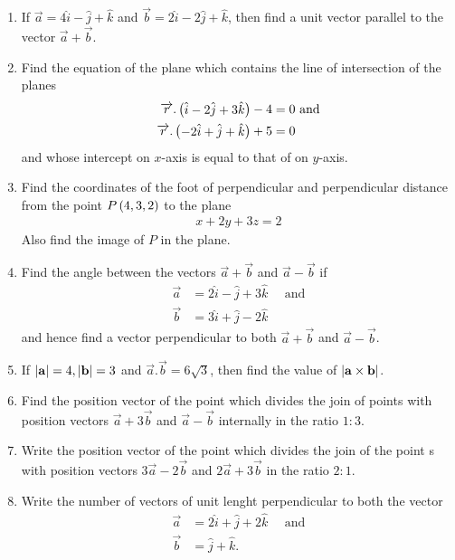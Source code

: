 \begin{enumerate}
	\item If $\overrightarrow{a} = 4\hat{i} - \hat{j} +\hat{k}$ and $\overrightarrow{b} = 2\hat{i} - 2\hat{j} + \hat{k}$, then find a unit vector parallel to the vector $\overrightarrow{a}+\overrightarrow{b}$.

	\item Find the equation of the plane which contains the line of intersection of the planes
	\begin{align*}
		\overrightarrow{r}.\begin{pmatrix}\hat{i} - 2\hat{j} + 3\hat{k}\end{pmatrix} - 4 &= 0 \text{  and}\\
		\overrightarrow{r}.\begin{pmatrix}-2\hat{i} + \hat{j} + \hat{k}\end{pmatrix} + 5 &= 0
	\end{align*}
and whose intercept on $x$-axis is equal to that of on $y$-axis.
\item Find the coordinates of the foot of perpendicular and perpendicular distance from the point $P\left(4, 3, 2\right)$ to the plane
          \begin{align*}
              x+2y+3z=2
          \end{align*}
          Also find the image of $P$ in the plane.
    \item Find the angle between the vectors $\vec{a} + \vec{b}$ and $\vec{a}-\vec{b}$ if
          \begin{align*}
              \vec{a} & =2\hat{i}-\hat{j}+3\hat{k} \quad \text{ and} \\
              \vec{b} & = 3\hat{i} + \hat{j} -2\hat{k}
          \end{align*}
          and hence find a vector perpendicular to both $\vec{a}+\vec{b}$ and $\vec{a}-\vec{b}$.
    \item If  $\left\vert\mathbf{a}\right\vert = 4 , \left\vert\mathbf{b}\right\vert=3$  and $\vec{a}.\vec{b}=6\sqrt{3}$, then find the value of $\left\vert\mathbf{a}\times \mathbf{b}\right\vert$.
    \item Find the position vector of the point which divides the join of points with position vectors $\vec{a}+3\vec{b}$ and $\vec{a}-\vec{b}$ internally in the ratio $1:3$.
    \item Write the position vector of the point which divides the join of the point s with position vectors $3\vec{a} - 2\vec{b}$ and $2\vec{a} + 3\vec{b}$ in the ratio $2:1$.
    \item Write the number of vectors of unit lenght perpendicular to both the vector
          \begin{align*}
              \vec{a} & = 2 \hat{i} + \hat{j} +2\hat{k} \quad\text{ and} \\
              \vec{b} & = \hat{j}+\hat{k}.

\end{align*}
\end{enumerate}

